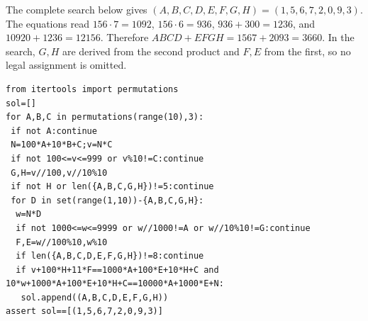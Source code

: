 The complete search below gives $(A,B,C,D,E,F,G,H)=(1,5,6,7,2,0,9,3)$. The equations read $156\cdot7=1092$, $156\cdot6=936$, $936+300=1236$, and $10920+1236=12156$. Therefore $ABCD+EFGH=1567+2093=\boxed{3660}$. In the search, $G,H$ are derived from the second product and $F,E$ from the first, so no legal assignment is omitted.
\begin{verbatim}
from itertools import permutations
sol=[]
for A,B,C in permutations(range(10),3):
 if not A:continue
 N=100*A+10*B+C;v=N*C
 if not 100<=v<=999 or v%10!=C:continue
 G,H=v//100,v//10%10
 if not H or len({A,B,C,G,H})!=5:continue
 for D in set(range(1,10))-{A,B,C,G,H}:
  w=N*D
  if not 1000<=w<=9999 or w//1000!=A or w//10%10!=G:continue
  F,E=w//100%10,w%10
  if len({A,B,C,D,E,F,G,H})!=8:continue
  if v+100*H+11*F==1000*A+100*E+10*H+C and 10*w+1000*A+100*E+10*H+C==10000*A+1000*E+N:
   sol.append((A,B,C,D,E,F,G,H))
assert sol==[(1,5,6,7,2,0,9,3)]
\end{verbatim}
